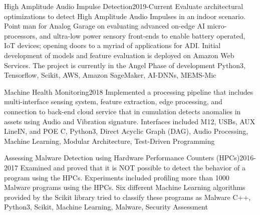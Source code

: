 %
%
%

\emptySeparator
{}
\begin{projects}
	\project
	{High Amplitude Audio Impulse Detection}{2019-Current}
	{}
	{Evaluate architectural optimizations to detect High Amplitude Audio Impulses in an indoor scenario. Point man for Analog Garage on evaluating advanced on-edge AI micro-processors, and ultra-low power sensory front-ends to enable battery operated, IoT devices; opening doors to a myriad of applications for ADI. Initial development of models and feature evaluation is deployed on Amazon Web Services. The project is currently in the Angel Phase of development}
	{Python3, Tensorflow, Scikit, AWS, Amazon SageMaker, AI-DNNs, MEMS-Mic}

	\project
	{Machine Health Monitoring}{2018}
	{}
	{Implemented a processing pipeline that includes multi-interface sensing system, feature extraction, edge processing, and connection to back-end cloud service that in cumulation detects anomalies in assets using Audio and Vibration signature. Interfaces included M12, USBs, AUX LineIN, and POE}
	{C, Python3, Direct Acyclic Graph (DAG), Audio Processing, Machine Learning, Modular Architecture, Test-Driven Programming}

	\project
	{Assessing Malware Detection using Hardware Performance Counters (HPCs)}{2016-2017}
	{}
	{Examined and proved that it is NOT possible to detect the behavior of a program using the HPCs. Experiments included profiling more than 1000 Malware programs using the HPCs. Six different Machine Learning algorithms provided by the Scikit library tried to classify these programs as Malware}
	{C++, Python3, Scikit, Machine Learning, Malware, Security Assessment}



\end{projects}
